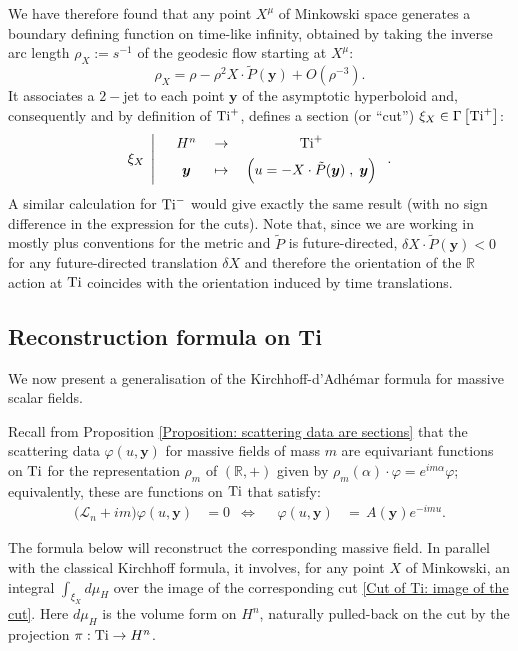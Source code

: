 \documentclass[a4paper, 10pt]{article}
\theoremstyle{remark}
\newcommand{\Ti}{\textnormal{Ti}}
\newcommand{\y}{\bm{y}}
\newcommand{\R}{\mathbb{R}}
\newcommand{\scal}{\cdot} %
\begin{document}
We have therefore found that any point $X^{\mu}$ of Minkowski space generates a boundary defining function on time-like infinity, obtained by taking the inverse arc length $\rho_X := s^{-1}$ of the geodesic flow starting at $X^{\mu}$:
\begin{equation}
    \rho_X = \rho -\rho^2 X \scal \tilde{P}(\bm{y}) + O(\rho^{-3}).
\end{equation}
It associates a $2-$jet to each point $\y$ of the asymptotic hyperboloid and, consequently and by definition of $\Ti^{+}$, defines a section (or ``cut'') $\xi_X \in \Gamma\left[\Ti^+\right]$:
\begin{equation}\label{Cut of Ti: image of the cut}
    \xi_X \;\left|\quad  \begin{array}{ccc}
       H^n  & \to & \Ti^{+} \\[0.4em]
       \bm{y}  &  \;\mapsto\; & \Big( u=  -X \scal \tilde{P}(\bm{y}) \;,\; \bm{y}\Big)
    \end{array}\right. .
\end{equation}
A similar calculation for $\Ti^-$ would give exactly the same result (with no sign difference in the expression for the cuts). Note that, since we are working in mostly plus conventions for the metric and $\tilde{P}$ is future-directed, $\delta X \scal \tilde{P}(\bm{y})<0$ for any future-directed translation $\delta X$ and therefore the orientation of the $\mathbb{R}$ action at $\Ti$ coincides with the orientation induced by time translations.

\subsection{Reconstruction formula on Ti}

We now present a generalisation of the Kirchhoff-d'Adhémar formula for massive scalar fields. 

Recall from Proposition \ref{Proposition: scattering data are sections} that the scattering data $\varphi(u,\y)$ for massive fields of mass $m$ are equivariant functions on $\Ti$ for the representation $\rho_m$ of $(\R,+)$ given by $\rho_m(\alpha)\cdot \varphi = e^{i m \alpha} \varphi$; equivalently, these are functions on $\Ti$ that satisfy:
\begin{align}\label{Reconstruction formula: homogeneity condition}
        \big( \mathcal{L}_n + im \big)\varphi(u,\y) &=0 &\Leftrightarrow&& \varphi(u, \y) &= \, A(\y) e^{-im u}.
\end{align}

   The formula below will reconstruct the corresponding massive field. In parallel with the classical Kirchhoff formula, it involves, for any point $X$ of Minkowski, an integral $\int_{\xi_X}d\mu_{H}$ over the image of the corresponding cut \eqref{Cut of Ti: image of the cut}. Here $d\mu_{H}$ is the volume form on $H^n$, naturally pulled-back on the cut by the projection $\pi : \Ti \to H^n$.
\end{document}
